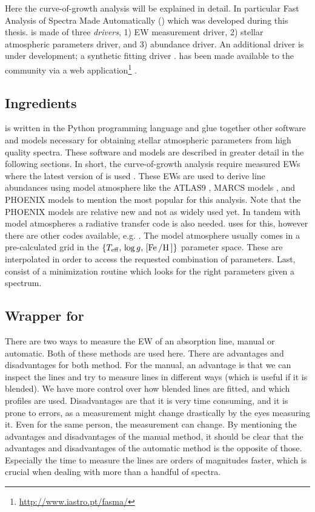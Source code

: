 Here the curve-of-growth analysis will be explained in detail. In particular
Fast Analysis of Spectra Made Automatically (\FASMA) which was developed during
this thesis. \FASMA is made of three \emph{drivers}, 1) EW measurement driver,
2) stellar atmospheric parameters driver, and 3) abundance driver. An additional
driver is under development; a synthetic fitting driver \citep{Tsantaki2017}.
\FASMA has been made available to the community via a web
application\footnote{\url{http://www.iastro.pt/fasma/}} \citep{Andreasen2017a}.


\subsection{Ingredients}

\FASMA is written in the Python programming language and glue together other
software and models necessary for obtaining stellar atmospheric parameters from
high quality spectra. These software and models are described in greater detail
in the following sections. In short, the curve-of-growth analysis require
measured EWs where the latest version of \ARES is used \citep{Sousa2015a}. These
EWs are used to derive line abundances using model atmosphere like the ATLAS9
\citep{Kurucz1993}, MARCS models \citep{Gustafson2008}, and PHOENIX models
\citep{Husser2013} to mention the most popular for this analysis. Note that the
PHOENIX models are relative new and not as widely used yet. In tandem with model
atmospheres a radiative transfer code is also needed. \FASMA uses \MOOG
\citep{Sneden1973} for this, however there are other codes available, e.g.
. The model atmosphere usually comes
in a pre-calculated grid in the $\{T_\mathrm{eff},\,\log
g,\,[\ion{Fe}/\ion{H}]\}$ parameter space. These are interpolated in order to
access the requested combination of parameters. Last, \FASMA consist of a
minimization routine which looks for the right parameters given a spectrum.



\subsection{Wrapper for \ARES}
\label{sec:measureEW}

There are two ways to measure the EW of an absorption line, manual or automatic.
Both of these methods are used here. There are advantages and disadvantages for
both method. For the manual, an advantage is that we can inspect the lines and
try to measure lines in different ways (which is useful if it is blended). We
have more control over how blended lines are fitted, and which profiles are
used. Disadvantages are that it is very time consuming, and it is prone to
errors, as a measurement might change drastically by the eyes measuring it. Even
for the same person, the measurement can change. By mentioning the advantages
and disadvantages of the manual method, it should be clear that the advantages
and disadvantages of the automatic method is the opposite of those. Especially
the time to measure the lines are orders of magnitudes faster, which is crucial
when dealing with more than a handful of spectra.

